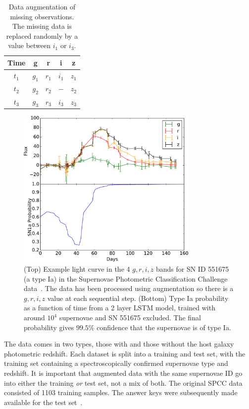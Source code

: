 \documentclass[nofootinbib,amsmath,amssymb,10pt,eqsecnum, twocolumn]{revtex4-1}
\begin{document}
\begin{table}[htdp]
\begin{center}
\begin{tabular}{|c|c|c|c|c|} \hline  
 Time & g & r & i & z \\ \hline \hline 
$ t_1$  & $g_1$ & $r_1$ &$ i_1$ & $z_1$ \\ \hline 
$ t_2$  & $g_2$ & $r_2$ &$  - $ & $z_2$ \\ \hline 
$ t_3$  & $g_3$ & $r_3$ &$ i_3$ & $z_3$ \\ \hline 
 \end{tabular}
\end{center}
\label{tab:augment}
\caption{Data augmentation of missing observations. The missing data is replaced randomly by a value between $i_1$ or $i_3$.}
\end{table}%

\begin{figure}
\centering
\includegraphics[width=88mm, angle=0]{2.pdf}
\caption{\label{fig:lightcurve} (Top) Example light curve in the 4 $g, r, i, z$ bands for SN ID 551675 (a type Ia) in the Supernovae Photometric Classification Challenge data~\cite{Kessler:2010wk}. The data has been processed using augmentation so there is a $g, r, i, z$ value at each sequential step. (Bottom) Type Ia probability as a function of time from a 2 layer LSTM model, trained with around $10^4$ supernovae and SN 551675 excluded. The final probability gives $99.5\%$ confidence that the supernovae is of type Ia. 
 }
\end{figure}


The data comes in two types, those with and those without the  host galaxy photometric redshift. Each dataset is split into a training and test set, with the training set containing a spectroscopically confirmed supernovae type and redshift. It is important that augmented data with the same supernovae ID go into either the training {\em or} test set, not a mix of both. The original SPCC data consisted of 1103 training samples. The answer keys were subsequently made available for the test set~\cite{Kessler:2010qj}. 
\end{document}
